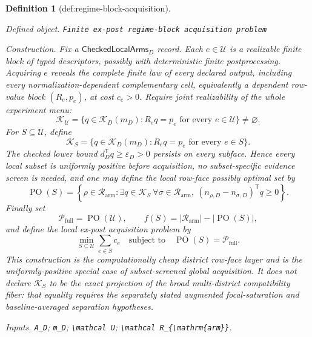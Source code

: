 \documentclass{article}
\newtheorem{definition}{Definition}
\begin{document}
\begin{definition}[def:regime-block-acquisition]\label{def:regime-block-acquisition}
\par\smallskip\noindent\emph{Defined object.} \texttt{Finite ex-\allowbreak{}post regime-\allowbreak{}block acquisition problem}
\par\smallskip\noindent\emph{Construction.} Fix a \(\mathsf{CheckedLocalArms}_D\) record.  Each \(e\in\mathcal U\) is a realizable finite block of typed descriptors, possibly with deterministic finite postprocessing.  Acquiring \(e\) reveals the complete finite law of every declared output, including every normalization-dependent complementary cell, equivalently a dependent row-value block \((R_e,p_e)\), at cost \(c_e>0\).  Require joint realizability of the whole experiment menu:
\[
\mathcal K_{\mathcal U}
=\{q\in\mathcal K_D(m_D):R_eq=p_e\text{ for every }e\in\mathcal U\}
\ne\varnothing.
\]
For \(S\subseteq\mathcal U\), define
\[
\mathcal K_S
=\{q\in\mathcal K_D(m_D):R_eq=p_e\text{ for every }e\in S\}.
\]
The checked lower bound \(d_D^{\mathsf T}q\geq\varepsilon_D>0\) persists on every subface.  Hence every local subset is uniformly positive before acquisition, no subset-specific evidence screen is needed, and one may define the local row-face possibly optimal set by
\[
\operatorname{PO}(S)
=\left\{\rho\in\mathcal R_{\mathrm{arm}}:
\exists q\in\mathcal K_S\ \forall\sigma\in\mathcal R_{\mathrm{arm}},\ 
(n_{\rho,D}-n_{\sigma,D})^{\mathsf T}q\geq0\right\}.
\]
Finally set
\[
\mathcal P_{\mathrm{full}}=\operatorname{PO}(\mathcal U),
\qquad
f(S)=|\mathcal R_{\mathrm{arm}}|-|\operatorname{PO}(S)|,
\]
and define the local ex-post acquisition problem by
\[
\min_{S\subseteq\mathcal U}\sum_{e\in S}c_e
\quad\text{subject to}\quad
\operatorname{PO}(S)=\mathcal P_{\mathrm{full}}.
\]
This construction is the computationally cheap district row-face layer and is the uniformly-positive special case of subset-screened global acquisition.  It does not declare \(\mathcal K_S\) to be the exact projection of the broad multi-district compatibility fiber: that equality requires the separately stated augmented focal-saturation and baseline-averaged separation hypotheses.
\par\smallskip\noindent\emph{Inputs.} \texttt{A\_\allowbreak{}D}; \texttt{m\_\allowbreak{}D}; \texttt{\textbackslash{}\allowbreak{}mathcal U}; \texttt{\textbackslash{}\allowbreak{}mathcal R\_\allowbreak{}\{\textbackslash{}\allowbreak{}mathrm\{arm\}\allowbreak{}\}\allowbreak{}}.
\end{definition}
\end{document}
